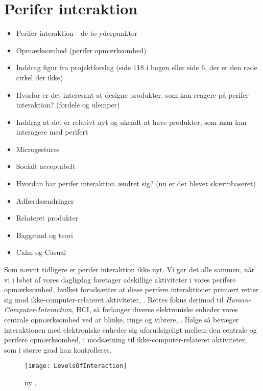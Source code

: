 \chapter{Perifer interaktion}
\label{PeriferInteratkion}
%
\begin{itemize}
  \item Perifer interaktion - de to yderpunkter
  \item Opmærksomhed (perifer opmærksomhed)
  \item Inddrag figur fra projektforslag (side 118 i bogen eller side 6, der er den røde cirkel der ikke)
  \item Hvorfor er det interesant at designe produkter, som kan reagere på perifer interaktion? (fordele og ulemper) 
  \item Inddrag at det er relativt nyt og ukendt at have produkter, som man kan interagere med perifert 
  \item Microgestures 
  \item Socialt acceptabelt 
  \item Hvordan har perifer interaktion ændret sig? (nu er det blevet skærmbaseret)
  \item Adfærdsændringer
  \item Relateret produkter  
  \item Baggrund og teori
  \item Calm og Casual
\end{itemize}
%
Som nævnt tidligere er perifer interaktion ikke nyt. Vi gør det alle sammen, når vi i løbet af vores dagligdag foretager adskillige aktiviteter i vores perifere opmærksomhed, hvilket forudsætter at disse perifere interaktioner primært retter sig mod ikke-computer-relateret aktiviteter, \parencite[s. 1]{PDF:PeripheralInteraction}. Rettes fokus derimod til \textit{Human-Computer-Interaction}, HCI, så forlanger diverse elektroniske enheder vores centrale opmærksomhed ved at blinke, ringe og vibrere, \parencite[s. 1]{PDF:PeripheralInteraction}. Ifølge \textcite[s. 3]{PDF:PeripheralInteraction} så bevæger interaktionen med elektroniske enheder sig uforudsigeligt mellem den centrale og perifere opmærksomhed, i modsætning til ikke-computer-relateret aktiviteter, som i større grad kan kontrolleres.      
%
\begin{figure}[H]
	\centering
	\texttt{[image: LevelsOfInteraction]}
	\caption{ny \textcite[s. 118]{PDF:PeripheralInteraction}.}
	\label{fig:LevelsOfInteraction}
\end{figure}
\noindent
%


